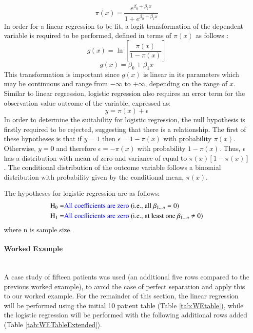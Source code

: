 \documentclass[../thesis.tex]{subfiles}
\begin{document}
\begin{equation}\label{eq:logreg}
    \pi(x) = \frac{e^{\beta_{0}+\beta_{1}x}}{1 +e^{\beta_{0}+\beta_{1}x}}
\end{equation}
In order for a linear regression to be fit, a logit transformation of the dependent variable is required to be performed, defined in terms of $\pi(x)$ as follows \cite{Hosmer1989}:
\begin{equation}
    g(x) = \ln \left[ \frac{\pi(x)}{1 - \pi(x)}
    \right]
\end{equation}
\begin{equation}\label{eq:logreg1}
    g(x) = \beta_{0} +\beta_{1}x
\end{equation}
This transformation is important since $g(x)$ is linear in its parameters which may be continuous and range from $-\infty$ to $+\infty$, depending on the range of $x$.
Similar to linear regression, logistic regression also requires an error term for the observation value outcome of the variable, expressed as:
\begin{equation}
    y = \pi(x) + \epsilon
\end{equation}
In order to determine the suitability for logistic regression, the null hypothesis is firstly required to be rejected, suggesting that there is a relationship. The first of these hypotheses is that if $y = 1$ then $\epsilon = 1 - \pi(x)$ with probability $\pi(x)$. Otherwise, $y=0$ and therefore $\epsilon = -\pi(x)$ with probability $ 1- \pi(x)$. Thus, $\epsilon$ has a distribution with mean of zero and variance of equal to $\pi(x)[1-\pi(x)]$. The conditional distribution of the outcome variable follows a binomial distribution with probability given by the conditional mean, $\pi(x)$.

The hypotheses for logistic regression are as follows:
\begin{align}
    \text{H}_{0} =& \text{\textcolor{blue}{All coefficients are zero} (i.e., all $\beta_{1...n} = 0$)}\\
    \text{H}_{1} =& \text{\textcolor{blue}{All coefficients are zero} (i.e., at least one $\beta_{1...n} \neq 0$)}
\end{align}
where n is sample size.

\paragraph{Worked Example}\\
A case study of fifteen patients was used (an additional five rows compared to the previous worked example), to avoid the case of perfect separation and apply this to our worked example. For the remainder of this section, the linear regression will be performed using the initial 10 patient table (Table \ref{tab:WEtable}), while the logistic regression will be performed with the following additional rows added (Table \ref{tab:WETableExtended}).
\end{document}
